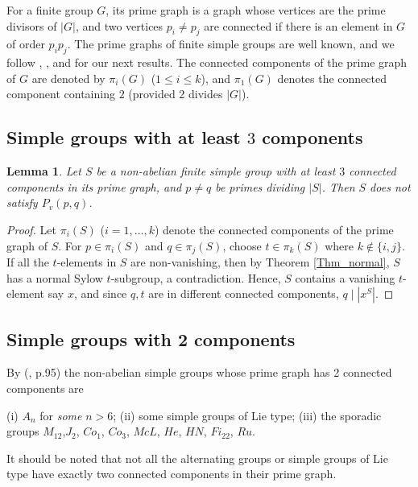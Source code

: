 \documentclass[11pt, a4paper]{article}
\numberwithin{equation}{section}
\theoremstyle{plain} %
\newtheorem{lemma}[theorem]{Lemma}
\begin{document}
For a finite group $G$, its prime graph is a graph whose vertices are the prime divisors of $|G|$, and two vertices $p_i\neq p_j$ are connected if there is an element in $G$ of order $p_ip_j$. The prime graphs of finite simple groups are well known, and we follow \cite{MR1922988}, \cite{MR617092}, and \cite{MR1015040} for our next results. The connected components of the prime graph of $G$ are denoted by $\pi_i(G)$ ($1\le i\le k$), and $\pi_1(G)$ denotes the connected component containing $2$ (provided $2$ divides $|G|$). 

\subsection*{Simple groups with at least $3$ components}
\begin{lemma}\label{lemma2.3}
Let $S$ be a non-abelian finite simple group with at least $3$ connected components in its prime graph, and $p\neq q$ be primes dividing $|S|$. Then $S$ does not satisfy $P_v(p,q)$. 
\end{lemma}
\begin{proof}
Let $\pi_i(S)$ ($i=1,\ldots,k$) denote the connected components of the prime graph of $S$. For $p\in \pi_i(S)$ and $q\in \pi_j(S)$, choose $t\in \pi_k(S)$ where $k\notin \{i,j\}$. If all the $t$-elements in $S$ are non-vanishing, then by Theorem \ref{Thm_normal}, $S$ has a normal Sylow $t$-subgroup, a contradiction. Hence, $S$ contains a vanishing $t$-element say $x$, and since $q,t$ are in different connected components, $q\mid |x^S|$.      
\end{proof}

\subsection*{Simple groups with 2 components}
By (\cite{MR1922988}, p.95) the non-abelian simple groups whose prime graph has 2 connected components are 

(i) $A_n$ for \textit{some} $n>6$; (ii) some simple groups of Lie type; (iii) the sporadic groups $M_{12}$,$J_2$, $Co_1$, $Co_3$, $McL$, $He$, $HN$, $Fi_{22}$, $Ru$. 

\vskip5mm
It should be noted that not all the alternating groups or simple groups of Lie type have exactly two connected components in their prime graph. 
\end{document}
